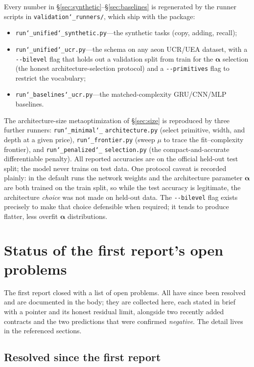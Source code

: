 \documentclass[11pt]{article}
\newcommand{\allowbreakhere}{\discretionary{}{}{}}
\newcommand{\code}[1]{\texttt{\def\_{\char`_\allowbreakhere}#1}}
\newcommand{\alphapar}{\bm{\alpha}}
\begin{document}
Every number in \S\ref{sec:synthetic}--\S\ref{sec:baselines} is regenerated by the runner
scripts in \code{validation\_runners/}, which ship with the package:
\begin{itemize}[leftmargin=1.4em,itemsep=1pt]
\item \code{run\_unified\_synthetic.py}---the synthetic tasks (copy, adding, recall);
\item \code{run\_unified\_ucr.py}---the schema on any aeon UCR/UEA dataset, with a
\code{-{}-bilevel} flag that holds out a validation split from train for the $\alphapar$
selection (the honest architecture-selection protocol) and a \code{-{}-primitives} flag to
restrict the vocabulary;
\item \code{run\_baselines\_ucr.py}---the matched-complexity GRU/CNN/MLP baselines.
\end{itemize}
The architecture-size metaoptimization of \S\ref{sec:size} is reproduced by three further
runners: \code{run\_minimal\_} \code{architecture.py} (select primitive, width, and depth at a
given price), \code{run\_frontier.py} (sweep $\mu$ to trace the fit--complexity frontier), and
\code{run\_penalized\_} \code{selection.py} (the compact-and-accurate differentiable penalty).
All reported accuracies are on the official held-out test split; the model never trains on test
data. One protocol caveat is recorded plainly: in the default runs the network weights and
the architecture parameter $\alphapar$ are both trained on the train split, so while the test
accuracy is legitimate, the architecture \emph{choice} was not made on held-out data. The
\code{-{}-bilevel} flag exists precisely to make that choice defensible when required; it tends
to produce flatter, less overfit $\alphapar$ distributions.

\section{Status of the first report's open problems}
\label{sec:future}

The first report closed with a list of open problems. All have since been resolved and are documented in the
body; they are collected here, each stated in brief with a pointer and its honest residual limit, alongside
two recently added contracts and the two predictions that were confirmed \emph{negative}. The detail lives
in the referenced sections.

\subsection{Resolved since the first report}
\end{document}
